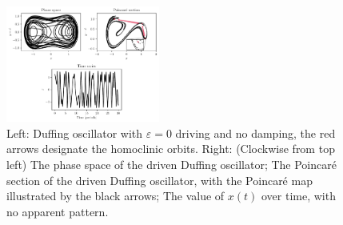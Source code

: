 \begin{ex}
\begin{figure}[h!]
	\includegraphics[width=0.45\textwidth]{figures/ch6/2pert_duffing.pdf}
	\caption{Left: Duffing oscillator with $\varepsilon=0$ driving and no damping, the red arrows designate the homoclinic orbits. Right: (Clockwise from top left) The phase space of the driven Duffing oscillator; The Poincaré section of the driven Duffing oscillator, with the Poincaré map illustrated by the black arrows; The value of $x(t)$ over time, with no apparent pattern.}
	\label{fig:pert_duffing}
\end{figure}

\end{ex}


